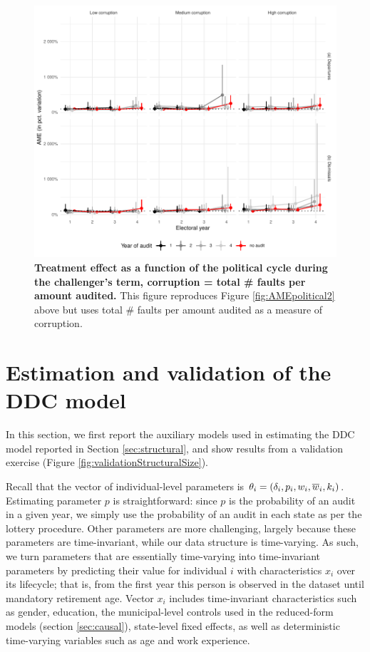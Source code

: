 {\begin{figure}[H]
   \centering
   \includegraphics{chapters/chapter_2/figures/AMEpoliticalSeriousPerAmount_term2Client.pdf}
   \caption{{\bf Treatment effect as a function of the political cycle during the challenger's term, corruption = total \# faults per amount audited.} This figure reproduces Figure \ref{fig:AMEpolitical2} above but uses total \# faults per amount audited as a measure of corruption.}
   \label{fig:AMEpolitical2_seriousPerAmount}
\end{figure}

\section{Estimation and validation of the DDC model}
\label{app:structural}

In this section, we first report the auxiliary models used in estimating the DDC model reported in Section \ref{sec:structural}, and show results from a validation exercise (Figure \ref{fig:validationStructuralSize}). 

Recall that the vector of individual-level parameters is $\theta_i = (\delta_i, p_i, w_i, \overline{w}_i, k_i)$. Estimating parameter $p$ is straightforward: since $p$ is the probability of an audit in a given year, we simply use the probability of an audit in each state as per the lottery procedure. Other parameters are more challenging, largely because these parameters are time-invariant, while our data structure is time-varying. As such, we turn parameters that are essentially time-varying into time-invariant parameters by predicting their value for individual $i$ with characteristics $x_i$ over its lifecycle; that is, from the first year this person is observed in the dataset until mandatory retirement age. Vector $x_i$ includes time-invariant characteristics such as gender, education, the municipal-level controls used in the reduced-form models (section \ref{sec:causal}), state-level fixed effects, as well as deterministic time-varying variables such as age and work experience. 

}
